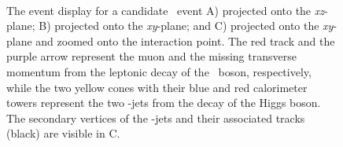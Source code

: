 \begin{figure}[htbp]
  \centering
  \mbox{
  }
  \mbox{
  }
  \caption[Event Display for \WmnHbb\ Candidate]{The event display for a candidate \WmnHbb\ event A) projected onto the \textit{xz}-plane; B) projected onto the \textit{xy}-plane; and C) projected onto the \textit{xy}-plane and zoomed onto the interaction point. The red track and the purple arrow represent the muon and the missing transverse momentum from the leptonic decay of the \bosW\ boson, respectively, while the two yellow cones with their blue and red calorimeter towers represent the two \qrkb-jets from the decay of the Higgs boson. The secondary vertices of the \qrkb-jets and their associated tracks (black) are visible in C.}
  \label{fig:evt_disp_Wmn}
\end{figure}

